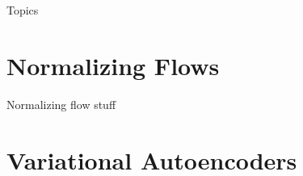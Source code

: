 \documentclass[aspectratio=169,xcolor=dvipsnames]{beamer}
\begin{document}
\begin{frame}[plain]
  \titlepage
\end{frame}

\begin{frame}[plain]{Topics}
  \tableofcontents
\end{frame}

\section{Normalizing Flows}
\begin{frame}{Normalizing flow stuff}
  
\end{frame}
\section{Variational Autoencoders}
\end{document}
